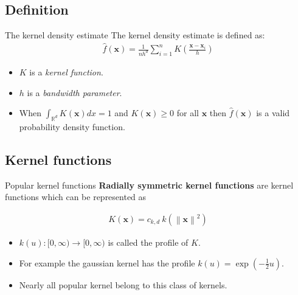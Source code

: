 \documentclass[18pt]{beamer}
\newcommand{\norm}[1]{\left\lVert#1\right\rVert}
\begin{document}
\subsection{Definition}

\begin{frame}{The kernel density estimate}
	The kernel density estimate is defined as:
	\begin{align*}
		\hat{f}(\bm{x}) = \frac{1}{n h^d} \sum_{i=1}^{n} K\left(\frac{\bm{x} - \bm{x}_i}{h} \right)
	\end{align*}
	
	\begin{itemize}
		\item $K$ is a \textit{kernel function}.
		\item $h$ is a \textit{bandwidth parameter}.
	\end{itemize}
	\begin{itemize}
		\item When $\int_{\mathbb{R}^d} K(\bm{x}) dx = 1$ and $K(\bm{x}) \geq 0$ for all $\bm{x}$ then $\hat{f}(\bm{x})$ is a valid probability density function.
	\end{itemize}
\end{frame}


\subsection{Kernel functions}


\begin{frame}{Popular kernel functions}
	\textbf{Radially symmetric kernel functions} are kernel functions which can be represented as
	
	\begin{align*}
		K(\bm{x}) = c_{k,d}\ k\left(\norm{\bm{x}}^2\right)
	\end{align*}
	
	\begin{itemize}
		\item $k(u) : [0, \infty) \rightarrow [0, \infty)$ is called the profile of $K$.
		\item For example the gaussian kernel has the profile $k(u) = \exp(-\frac{1}{2}u)$.
		\item Nearly all popular kernel belong to this class of kernels.
	\end{itemize}
\end{frame}
\end{document}
